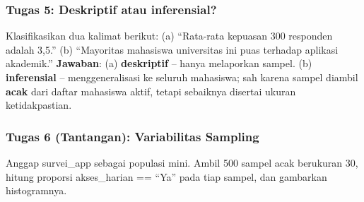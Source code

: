 \documentclass[
  indonesian,
  letterpaper,
]{book}
\newenvironment{Shaded}{\begin{snugshade}}{\end{snugshade}}
\newcommand{\AttributeTok}[1]{\textcolor[rgb]{0.40,0.45,0.13}{#1}}
\newcommand{\DecValTok}[1]{\textcolor[rgb]{0.68,0.00,0.00}{#1}}
\newcommand{\FunctionTok}[1]{\textcolor[rgb]{0.28,0.35,0.67}{#1}}
\newcommand{\NormalTok}[1]{\textcolor[rgb]{0.00,0.23,0.31}{#1}}
\newcommand{\OtherTok}[1]{\textcolor[rgb]{0.00,0.23,0.31}{#1}}
\newcommand{\SpecialCharTok}[1]{\textcolor[rgb]{0.37,0.37,0.37}{#1}}
\newcommand{\StringTok}[1]{\textcolor[rgb]{0.13,0.47,0.30}{#1}}
\begin{document}
\subsubsection{Tugas 5: Deskriptif atau
inferensial?}\label{tugas-5-deskriptif-atau-inferensial}

Klasifikasikan dua kalimat berikut: (a) ``Rata-rata kepuasan 300
responden adalah 3,5.'' (b) ``Mayoritas mahasiswa universitas ini puas
terhadap aplikasi akademik.'' \textbf{Jawaban}: (a) \textbf{deskriptif}
-- hanya melaporkan sampel. (b) \textbf{inferensial} -- menggeneralisasi
ke seluruh mahasiswa; sah karena sampel diambil \textbf{acak} dari
daftar mahasiswa aktif, tetapi sebaiknya disertai ukuran ketidakpastian.

\subsubsection{Tugas 6 (Tantangan): Variabilitas
Sampling}\label{tugas-6-tantangan-variabilitas-sampling}

Anggap survei\_app sebagai populasi mini. Ambil 500 sampel acak
berukuran 30, hitung proporsi akses\_harian == ``Ya'' pada tiap sampel,
dan gambarkan histogramnya.

\begin{Shaded}
\end{Shaded}
\end{document}
